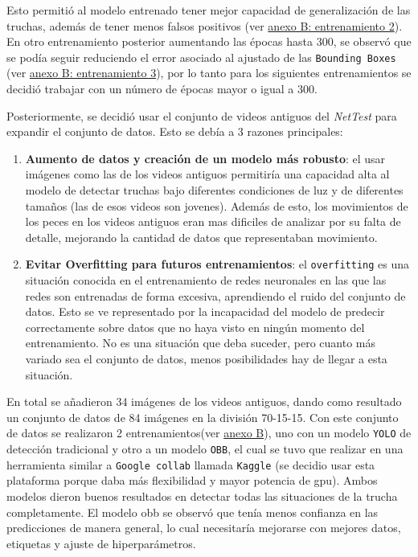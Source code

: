 Esto permitió al modelo entrenado tener mejor capacidad de generalización de las truchas, además de tener menos falsos positivos (ver \hyperref[train:2]{anexo B: entrenamiento 2}). En otro entrenamiento 
posterior aumentando las épocas hasta 300, se observó que se podía seguir reduciendo el error asociado al ajustado de las \texttt{Bounding Boxes} (ver \hyperref[train:3]{anexo B: entrenamiento 3}), por lo 
tanto para los siguientes entrenamientos se decidió trabajar con un número de épocas mayor o igual a 300.
\clearpage

Posteriormente, se decidió usar el conjunto de videos antiguos del \textit{NetTest} para expandir el conjunto de datos. Esto se debía a 3 razones principales:
\begin{enumerate}
    \item \textbf{Aumento de datos y creación de un modelo más robusto}: el usar imágenes como las de los videos antiguos permitiría una capacidad alta al modelo de detectar truchas bajo diferentes condiciones de luz y de diferentes tamaños (las de esos videos son 
    jovenes). Además de esto, los movimientos de los peces en los videos antiguos eran mas dificiles de analizar por su falta de detalle, mejorando la cantidad de datos que representaban movimiento.
    \item \textbf{Evitar Overfitting para futuros entrenamientos}: el \texttt{overfitting} es una situación conocida en el entrenamiento de redes neuronales en las que las redes son entrenadas de forma excesiva, aprendiendo el ruido
     del conjunto de datos. Esto se ve representado por la incapacidad del modelo de predecir correctamente sobre datos que no haya visto en ningún momento del entrenamiento. No es una situación que deba suceder, pero cuanto más 
    variado sea el conjunto de datos, menos posibilidades hay de llegar a esta situación.
\end{enumerate}

En total se añadieron 34 imágenes de los videos antiguos, dando como resultado un conjunto de datos de 84 imágenes en la división 70-15-15.\newline
Con este conjunto de datos se realizaron 2 entrenamientos(ver \hyperref[train:4]{anexo B}), uno con un modelo \texttt{YOLO} de detección tradicional y otro a un modelo \texttt{OBB}, el cual se tuvo que realizar en una herramienta similar a \texttt{Google collab} 
llamada \texttt{Kaggle} (se decidio usar esta plataforma porque daba más flexibilidad y mayor potencia de \acrshort{gpu}).\newline
Ambos modelos dieron buenos resultados en detectar todas las situaciones de la trucha completamente. 
El modelo \acrshort{obb} se observó que tenía menos confianza en las predicciones de manera general, lo cual necesitaría mejorarse con mejores datos, etiquetas y ajuste de hiperparámetros.

